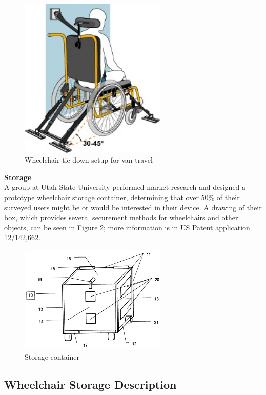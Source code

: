 \begin{figure}[h]
  \centering
     \includegraphics[width=7cm]{images/wc_van.jpg}
   \caption{Wheelchair tie-down setup for van travel}
  \label{fig:tie-down}
\end{figure}

\noindent\textbf{Storage}\\
A group at Utah State University performed market research \cite{USU_survey} and designed a prototype wheelchair storage container, determining that over 50\% of their surveyed users might be or would be interested in their device. A drawing of their box, which provides several securement methods for wheelchairs and other objects, can be seen in Figure \ref{fig:USU_box}; more information is in US Patent application 12/142,662.\cite{USU_patent}

\begin{figure}[h]
  \centering
     \includegraphics[width=7cm]{images/USU_box.png}
   \caption{Storage container}
  \label{fig:USU_box}
\end{figure}

\subsection{Wheelchair Storage Description}


